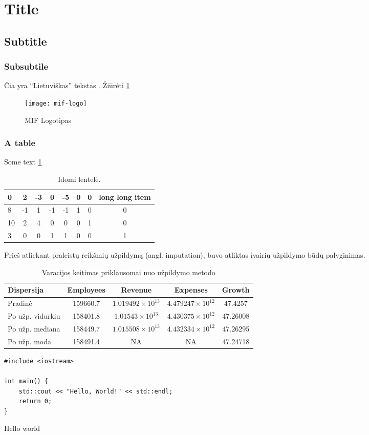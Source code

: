 \section{Title}
\subsection{Subtitle}
\subsubsection{Subsubtile}

Čia yra \enquote{Lietuviškas} tekstas \cite{Badr_2019}. Žiūrėti \ref{fig:excorr}

\begin{figure}[H]
	\centering
	\texttt{[image: mif-logo]}
	\caption{MIF Logotipas}
	\label{fig:excorr}
\end{figure}

\subsubsection{A table}

Some text \ref{tab:example-table}

\begin{table}[H]
	\centering
	\caption{Idomi lentelė.}
	\label{tab:example-table}
	\begin{tabular}{@{}lccccccc@{}}
		\toprule
		0  & 2  & -3 & 0  & -5 & 0 & 0 & long long item \\ \midrule
		8  & -1 & 1  & -1 & -1 & 1 & 0 & 0              \\
		10 & 2  & 4  & 0  & 0  & 0 & 1 & 0              \\
		3  & 0  & 0  & 1  & 1  & 0 & 0 & 1              \\ \bottomrule
	\end{tabular}
\end{table}

Prieš atliekant praleistų reikšmių užpildymą (angl. imputation), buvo atliktas įvairių užpildymo būdų palyginimas.

\begin{table}[H]
	\centering
	\caption{Varacijos keitimas priklausomai nuo užpildymo metodo}
	\label{tab:dt-pre-analysis-2}
	\begin{tabular}{lcccc}
		\toprule
		Dispersija       & Employees & Revenue                     & Expenses                    & Growth   \\
		\midrule
		Pradinė          & 159660.7  & \(1.019492 \times 10^{13}\) & \(4.479247 \times 10^{12}\) & 47.4257  \\
		Po užp. vidurkiu & 158401.8  & \(1.01543 \times 10^{13}\)  & \(4.430375 \times 10^{12}\) & 47.26008 \\
		Po užp. mediana  & 158449.7  & \(1.015508 \times 10^{13}\) & \(4.432334 \times 10^{12}\) & 47.26295 \\
		Po užp. moda     & 158491.4  & NA                          & NA                          & 47.24718 \\
		\bottomrule
	\end{tabular}
\end{table}

\begin{listing}[H]
\begin{verbatim}
#include <iostream>

int main() {
	std::cout << "Hello, World!" << std::endl;
	return 0;
}
\end{verbatim}
\caption{Hello world}
\end{listing}
